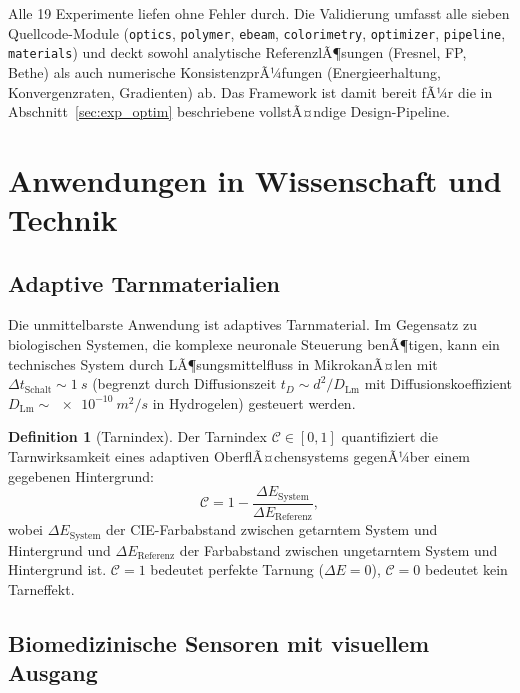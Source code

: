 ﻿\documentclass[a4paper,12pt]{article}
\theoremstyle{definition}
\newtheorem{definition}{Definition}[section]
\begin{document}
	Alle 19 Experimente liefen ohne Fehler durch.  Die Validierung umfasst
	alle sieben Quellcode-Module (\texttt{optics}, \texttt{polymer},
	\texttt{ebeam}, \texttt{colorimetry}, \texttt{optimizer},
	\texttt{pipeline}, \texttt{materials}) und deckt sowohl analytische
	ReferenzlÃ¶sungen (Fresnel, FP, Bethe) als auch numerische
	KonsistenzprÃ¼fungen (Energieerhaltung, Konvergenzraten, Gradienten)
	ab.  Das Framework ist damit bereit fÃ¼r die in Abschnitt~\ref{sec:exp_optim}
	beschriebene vollstÃ¤ndige Design-Pipeline.
	
	
	\section{Anwendungen in Wissenschaft und Technik}
	\label{sec:anwendungen}
	
	\subsection{Adaptive Tarnmaterialien}
	
	Die unmittelbarste Anwendung ist adaptives Tarnmaterial. Im Gegensatz zu
	biologischen Systemen, die komplexe neuronale Steuerung benÃ¶tigen, kann ein
	technisches System durch LÃ¶sungsmittelfluss in MikrokanÃ¤len mit
	$\Delta t_\mathrm{Schalt} \sim \SI{1}{s}$ (begrenzt durch
	Diffusionszeit $t_D \sim d^2/D_\mathrm{Lm}$ mit Diffusionskoeffizient
	$D_\mathrm{Lm} \sim \SI{e-10}{m^2/s}$ in Hydrogelen) gesteuert werden.
	
	\begin{definition}[Tarnindex]
		\label{def:tarnindex}
		Der Tarnindex $\mathcal{C} \in [0,1]$ quantifiziert die Tarnwirksamkeit
		eines adaptiven OberflÃ¤chensystems gegenÃ¼ber einem gegebenen Hintergrund:
		\begin{equation}
			\mathcal{C} = 1 - \frac{\Delta E_\mathrm{System}}{\Delta E_\mathrm{Referenz}},
			\label{eq:tarnindex}
		\end{equation}
		wobei $\Delta E_\mathrm{System}$ der CIE-Farbabstand zwischen getarntem
		System und Hintergrund und $\Delta E_\mathrm{Referenz}$ der Farbabstand
		zwischen ungetarntem System und Hintergrund ist.
		$\mathcal{C} = 1$ bedeutet perfekte Tarnung ($\Delta E = 0$),
		$\mathcal{C} = 0$ bedeutet kein Tarneffekt.
	\end{definition}
	
	\subsection{Biomedizinische Sensoren mit visuellem Ausgang}
	
\end{document}
